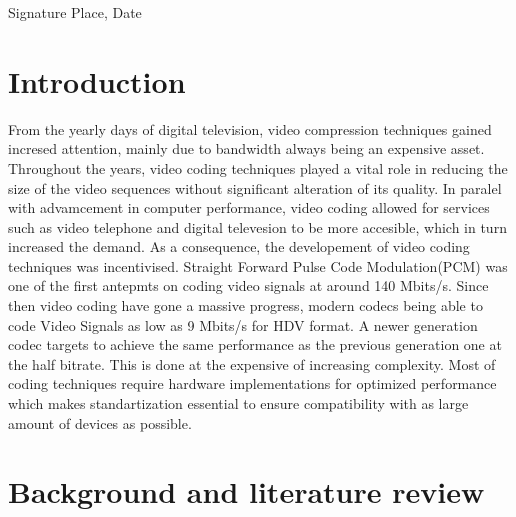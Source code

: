 \documentclass[a4paper,11pt,oneside]{article}
\begin{document}
  \vspace{20mm}

  Signature \hfill Place, Date

  \newpage
  \begin{abstract}
 
  
  \end{abstract}

  
  \clearpage

  \fi

  \newpage
  \tableofcontents

  \newpage
  \listoffigures

  \newpage

  \section{Introduction}
  \indent From the yearly days of digital television, video compression techniques gained incresed attention, mainly due to bandwidth always being 
  an expensive asset. Throughout the years, video coding techniques played a vital role in reducing the size of the video sequences without significant
  alteration of its quality. In paralel with advamcement in computer performance, video coding allowed for services such as video telephone and digital 
  televesion to be more accesible, which in turn increased the demand. As a consequence, the developement of video coding techniques was incentivised. 
  Straight Forward Pulse Code Modulation(PCM) was one of the first antepmts on coding video signals at around 140 Mbits/s. Since then video coding 
  have gone a massive progress, modern codecs being able to code Video Signals as low as 9 Mbits/s for HDV format. A newer generation codec targets 
  to achieve the same performance as the previous generation one at the half bitrate. This is done at the expensive of increasing complexity. Most of coding
  techniques require hardware implementations for optimized performance which makes standartization essential to ensure compatibility with as large amount of devices 
  as possible.
  
  \newpage
  \section{Background and literature review}
  
\end{document}
